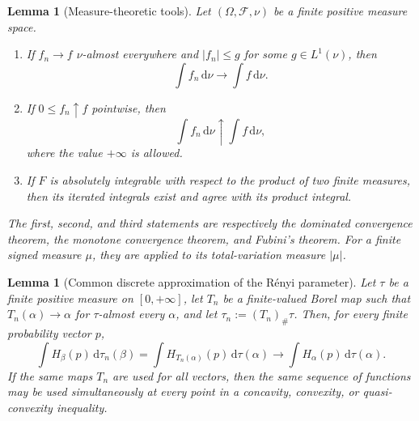 \documentclass[aps,pra,11pt,onecolumn,nofootinbib,tightenlines]{revtex4-2}
\newtheorem{lemma}[theorem]{Lemma}
\theoremstyle{definition}
\begin{document}
\begin{lemma}[Measure-theoretic tools]
\label{lem:app-measure-tools}
Let $(\Omega,\mathcal F,\nu)$ be a finite positive measure space.
\begin{enumerate}
 \item If $f_n\to f$ $\nu$-almost everywhere and $|f_n|\leq g$ for some $g\in L^1(\nu)$, then
 \begin{equation}
  \int f_n\,\mathrm d\nu\longrightarrow\int f\,\mathrm d\nu.
  \label{eq:app-DCT-statement}
 \end{equation}
 \item If $0\leq f_n\uparrow f$ pointwise, then
 \begin{equation}
  \int f_n\,\mathrm d\nu\uparrow\int f\,\mathrm d\nu,
  \label{eq:app-MCT-statement}
 \end{equation}
 where the value $+\infty$ is allowed.
 \item If $F$ is absolutely integrable with respect to the product of two finite measures, then its iterated integrals exist and agree with its product integral.
\end{enumerate}
The first, second, and third statements are respectively the dominated convergence theorem, the monotone convergence theorem, and Fubini's theorem.  For a finite signed measure $\mu$, they are applied to its total-variation measure $|\mu|$.
\end{lemma}

\begin{lemma}[Common discrete approximation of the R\'enyi parameter]
\label{lem:app-common-discretisation}
Let $\tau$ be a finite positive measure on $[0,+\infty]$, let $T_n$ be a finite-valued Borel map such that $T_n(\alpha)\to\alpha$ for $\tau$-almost every $\alpha$, and let $\tau_n:=(T_n)_\#\tau$.  Then, for every finite probability vector $p$,
\begin{equation}
 \int H_\beta(p)\,\mathrm d\tau_n(\beta)
 =\int H_{T_n(\alpha)}(p)\,\mathrm d\tau(\alpha)
 \longrightarrow
 \int H_\alpha(p)\,\mathrm d\tau(\alpha).
 \label{eq:app-common-discretisation-limit}
\end{equation}
If the same maps $T_n$ are used for all vectors, then the same sequence of functions may be used simultaneously at every point in a concavity, convexity, or quasi-convexity inequality.
\end{lemma}
\end{document}
